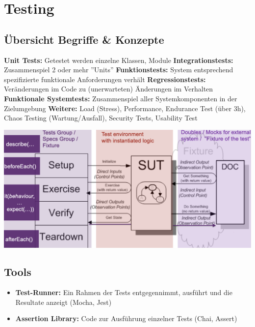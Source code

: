 
\section{Testing}


\subsection{Übersicht Begriffe \& Konzepte}
\textbf{Unit Tests:} Getestet werden einzelne Klassen, Module
\textbf{Integrationstests:} Zusammenspiel 2 oder mehr ''Units''
\textbf{Funktionstests:} System entsprechend spezifizierte funktionale Anforderungen verhält
\textbf{Regressionstests:} Veränderungen im Code zu (unerwarteten) Änderungen im Verhalten
\textbf{Funktionale Systemtests:} Zusammenspiel aller Systemkomponenten in der Zielumgebung
\textbf{Weitere:} Load (Stress), Performance, Endurance Test (über 3h), Chaos Testing (Wartung/Ausfall), Security Tests, Usability Test

\vspace{-8pt}
\begin{center}
    \includegraphics[width=\linewidth]{graphic/testing/Unit-Testing.png}
\end{center}
\vspace{-8pt}

\subsection{Tools}
\begin{itemize}
    \item \textbf{Test-Runner:} Ein Rahmen der Tests entgegennimmt, ausführt und die Resultate anzeigt (Mocha, Jest)
    \item \textbf{Assertion Library:} Code zur Ausführung einzelner Tests (Chai, Assert)
\end{itemize}



